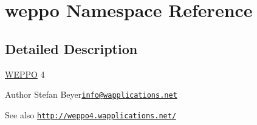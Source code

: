 \hypertarget{namespaceweppo}{}\section{weppo Namespace Reference}
\label{namespaceweppo}


\subsection{Detailed Description}
\hyperlink{namespaceWEPPO}{W\+E\+P\+PO} 4

\begin{DoxyAuthor}{Author}
Stefan Beyer\href{mailto:info@wapplications.net}{\tt info@wapplications.\+net} 
\end{DoxyAuthor}
\begin{DoxySeeAlso}{See also}
\href{http://weppo4.wapplications.net/}{\tt http\+://weppo4.\+wapplications.\+net/} 
\end{DoxySeeAlso}
